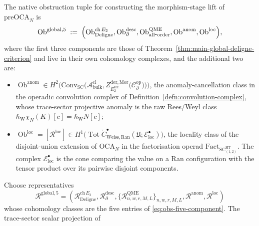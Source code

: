 \begin{thm}
The native obstruction tuple for constructing the morphism-stage lift of
\(\mathrm{preOCA}_N\) is
\begin{equation}\label{eq:obs-five-component}
  \operatorname{Ob}^{\mathrm{global},5}
   \;:=\;
  \Bigl(
   \operatorname{Ob}^{\mathrm{ch}\,E_2}_{\mathrm{Deligne}}
   ,
   \operatorname{Ob}^{\mathrm{desc}}_{\partial}
   ,
   \operatorname{Ob}^{\mathrm{QME}}_{\mathrm{all\mbox{-}order}}
   ,
   \operatorname{Ob}^{\mathrm{anom}}
   ,
   \operatorname{Ob}^{\mathrm{loc}}
  \Bigr),
\end{equation}
where the first three components are those of
Theorem~\ref{thm:main-global-deligne-criterion} and live in their own
cohomology complexes, and the additional two are:
\begin{itemize}
  \item \(\operatorname{Ob}^{\mathrm{anom}}\in
        H^2\bigl(\mathrm{Conv}_{\mathrm{SC}}\!\bigl(
          \mathcal A^{\mathrm{cl}}_{\mathrm{bulk}},
          Z^{\mathrm{der},\mathrm{Mor}}_{E_2^{\mathrm{HT}}}\!\bigl(
            \mathcal C^{\mathrm{op}}_\partial\bigr)\bigr)\bigr)\),
        the anomaly-cancellation class in the operadic convolution complex of
        Definition~\ref{defn:convolution-complex}, whose trace-sector
        projective anomaly is the raw Rees/Weyl class
        \(\hbar_{\mathrm{W}}\chi_N(K)[\bar c]
        =\hbar_{\mathrm{W}}N[\bar c]\);
  \item \(\operatorname{Ob}^{\mathrm{loc}}=[\mathcal R^{\mathrm{loc}}]\in
        H^1\!\bigl(
        \operatorname{Tot}\check C^\bullet_{\mathrm{Weiss,Ran}}
        (\mathfrak U;\mathcal E^\bullet_{\mathrm{loc}})\bigr)\), the
        locality class of the disjoint-union extension of
        \(\mathrm{OCA}_N\) in the factorisation
        operad \(\mathrm{Fact}_{\mathrm{SC}^{\mathrm{HT}}_{(1,2)}}\).
        The complex \(\mathcal E^\bullet_{\mathrm{loc}}\) is the cone
        comparing the value on a Ran configuration with the tensor product
        over its pairwise disjoint components.
\end{itemize}
Choose representatives
\begin{equation}\label{eq:global-five-representatives}
  \mathcal R^{\mathrm{global},5}
  =
  \left(
  \mathcal R^{\mathrm{ch}\,E_2}_{\mathrm{Deligne}},
  \mathcal R^{\mathrm{desc}}_{\partial},
  \{\mathcal R^{\mathrm{QME}}_{n,w,r,M,L}\}_{n,w,r,M,L},
  \mathcal R^{\mathrm{anom}},
  \mathcal R^{\mathrm{loc}}
  \right)
\end{equation}
whose cohomology classes are the five entries of
\eqref{eq:obs-five-component}.  The trace-sector scalar projection of

\end{thm}
